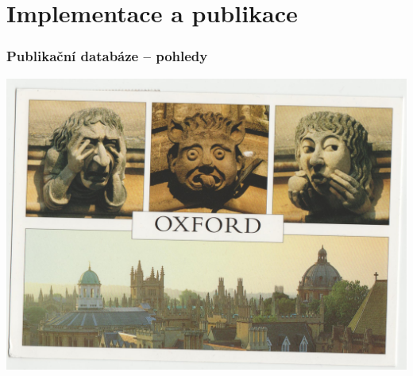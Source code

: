 \section{Implementace a publikace}




\begin{frame}
\frametitle{Publikační databáze -- pohledy}
\begin{center}
\includegraphics[scale=0.12]{obrazky/pohled.jpg}
\end{center}
\end{frame}

